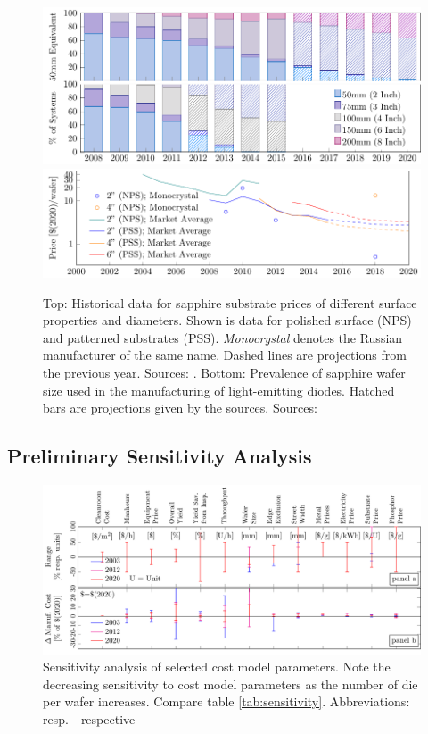 \documentclass[10pt]{article}
\begin{document}
\begin{figure}[h!]
    \includegraphics[width=14.5cm]{./figures/wafer_size.pdf}
    \includegraphics[width=15cm]{./figures/sapphire_prices.pdf}
	\caption{Top: Historical data for sapphire substrate prices of different surface properties and diameters. Shown is data for polished surface (NPS) and patterned substrates (PSS). \textit{Monocrystal} denotes the Russian manufacturer of the same name. Dashed lines are projections from the previous year. Sources: \cite{monocrystal2020private}\cite{yole2011sapphire}\cite{yole2015sapphire}. Bottom: Prevalence of sapphire wafer size used in the manufacturing of light-emitting diodes. Hatched bars are projections given by the sources. Sources: \cite{veeco2013}\cite{Scholand2012}\cite{yole2015sapphire}}
	\label{fig:wafer_size}
\end{figure}

\subsection{Preliminary Sensitivity Analysis}

\begin{figure}[h]
	\centering
    \includegraphics[width=\textwidth]{2_SSL_EES/article/figures/costmodel_sensitivity.pdf}
	\caption{Sensitivity analysis of selected cost model parameters. Note the decreasing sensitivity to cost model parameters as the number of die per wafer increases. Compare table \ref{tab:sensitivity}. Abbreviations: resp. - respective}
	\label{fig:sensitivity}
\end{figure}
\end{document}
